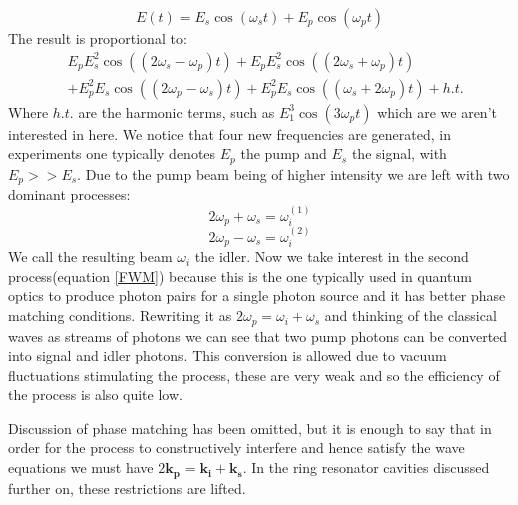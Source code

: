 \begin{equation}
E(t)=E_s\cos(\omega_st)+E_p\cos(\omega_pt)
\end{equation}
\noindent
The result is proportional to:
\begin{align}
&E_p E_s^2 \cos ((2 {\omega_s}-{\omega_p})t)+E_p E_s^2 \cos ((2 {\omega_s}+{\omega_p})t)\\
&+ E_p^2 E_s \cos ((2{\omega_p}-{\omega_s})t)+ E_p^2 E_s \cos (({\omega_s}+2 \omega_p)t) + h.t.
\end{align}
\noindent
Where $h.t.$ are the harmonic terms, such as $E_1^3\cos(3\omega_p t)$ which are we aren't interested in here. We notice that four new frequencies are generated, in experiments one typically denotes $E_p$ the pump and $E_s$ the signal, with $E_p >> E_s$. Due to the pump beam being of higher intensity we are left with two dominant processes:
\begin{equation}
	2\omega_p+\omega_s = \omega_i^{(1)}
\end{equation}
\begin{equation} \label{FWM}
	2\omega_p-\omega_s = \omega_i^{(2)}
\end{equation}
We call the resulting beam $\omega_i$ the idler. Now we take interest in the second process(equation \ref{FWM}) because this is the one typically used in quantum optics to produce photon pairs for a single photon source and it has better phase matching conditions. Rewriting it as $	2\omega_p = \omega_i+\omega_s$ and thinking of the classical waves as streams of photons we can see that two pump photons can be converted into signal and idler photons. This conversion is allowed due to vacuum fluctuations stimulating the process, these are very weak and so the efficiency of the process is also quite low.

Discussion of phase matching has been omitted, but it is enough to say that in order for the process to constructively interfere and hence satisfy the wave equations we must have $2\mathbf{k_p}=\mathbf{k_i}+\mathbf{k_s}$. In the ring resonator cavities discussed further on, these restrictions are lifted.


